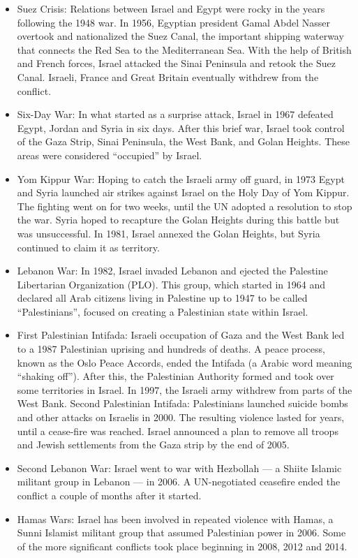 \documentclass[10pt]{article}
\begin{document}
\begin{itemize}
	\item Suez Crisis: Relations between Israel and Egypt were rocky in the years following the 1948 war. In 1956, Egyptian president Gamal Abdel Nasser overtook and nationalized the Suez Canal, the important shipping waterway that connects the Red Sea to the Mediterranean Sea. With the help of British and French forces, Israel attacked the Sinai Peninsula and retook the Suez Canal. Israeli, France and Great Britain eventually withdrew from the conflict.
	\item Six-Day War: In what started as a surprise attack, Israel in 1967 defeated Egypt, Jordan and Syria in six days. After this brief war, Israel took control of the Gaza Strip, Sinai Peninsula, the West Bank, and Golan Heights. These areas were considered “occupied” by Israel.
	\item Yom Kippur War: Hoping to catch the Israeli army off guard, in 1973 Egypt and Syria launched air strikes against Israel on the Holy Day of Yom Kippur. The fighting went on for two weeks, until the UN adopted a resolution to stop the war. Syria hoped to recapture the Golan Heights during this battle but was unsuccessful. In 1981, Israel annexed the Golan Heights, but Syria continued to claim it as territory.
	\item Lebanon War: In 1982, Israel invaded Lebanon and ejected the Palestine Libertarian Organization (PLO). This group, which started in 1964 and declared all Arab citizens living in Palestine up to 1947 to be called “Palestinians”, focused on creating a Palestinian state within Israel.
	\item First Palestinian Intifada: Israeli occupation of Gaza and the West Bank led to a 1987 Palestinian uprising and hundreds of deaths. A peace process, known as the Oslo Peace Accords, ended the Intifada (a Arabic word meaning “shaking off”). After this, the Palestinian Authority formed and took over some territories in Israel. In 1997, the Israeli army withdrew from parts of the West Bank.
Second Palestinian Intifada: Palestinians launched suicide bombs and other attacks on Israelis in 2000. The resulting violence lasted for years, until a cease-fire was reached. Israel announced a plan to remove all troops and Jewish settlements from the Gaza strip by the end of 2005.
	\item Second Lebanon War: Israel went to war with Hezbollah — a Shiite Islamic militant group in Lebanon — in 2006. A UN-negotiated ceasefire ended the conflict a couple of months after it started.
	\item Hamas Wars: Israel has been involved in repeated violence with Hamas, a Sunni Islamist militant group that assumed Palestinian power in 2006. Some of the more significant conflicts took place beginning in 2008, 2012 and 2014.
\end{itemize}
\end{document}
